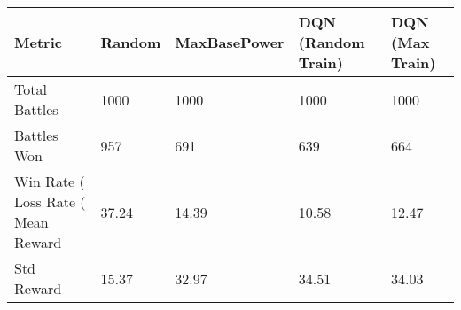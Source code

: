 \begin{tabular}{lllll}
\toprule
Metric & Random & MaxBasePower & DQN (Random Train) & DQN (Max Train) \\
\midrule
Total Battles & 1000 & 1000 & 1000 & 1000 \\
Battles Won & 957 & 691 & 639 & 664 \\
Win Rate (%
Loss Rate (%
Mean Reward & 37.24 & 14.39 & 10.58 & 12.47 \\
Std Reward & 15.37 & 32.97 & 34.51 & 34.03 \\
\bottomrule
\end{tabular}
